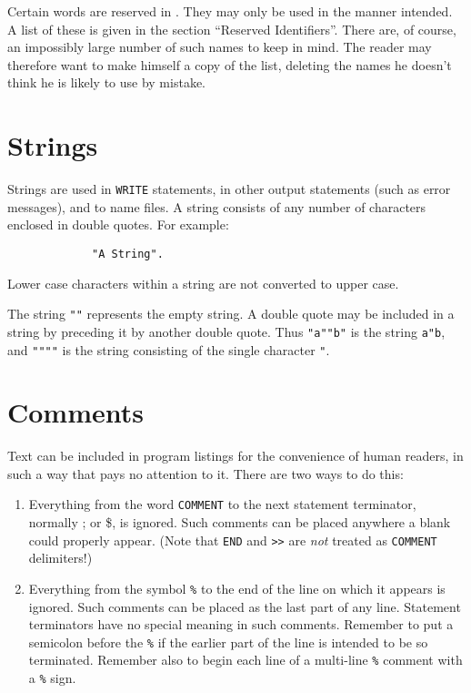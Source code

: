 Certain words are reserved in {\REDUCE}. They may only be used in the manner
intended. A list of these is given in the section ``Reserved Identifiers''.
There are, of course, an impossibly large number of such names to keep in
mind. The reader may therefore want to make himself a copy of the list,
deleting the names he doesn't think he is likely to use by mistake.

\section{Strings}

Strings are used in \texttt{WRITE} statements, in other
output statements (such as error messages), and to name files.  A string
consists of any number of characters enclosed in double quotes.  For example:
\begin{verbatim}
             "A String".
\end{verbatim}
Lower case characters within a string are not converted to upper case.

The string \texttt{""} represents the empty string.  A double quote may be
included in a string by preceding it by another double quote.  Thus
\texttt{"a""b"} is the string \texttt{a"b}, and \texttt{""""} is the string
consisting of the single character \texttt{"}.

\hypertarget{comments}{\section{Comments}}

Text can be included in program listings for the
convenience of human readers, in such a way that {\REDUCE} pays no
attention to it.  There are two ways to do this:

\begin{enumerate}
\item Everything from the word \texttt{COMMENT} to the next
statement terminator, normally ; or \$, is ignored.  Such comments
can be placed anywhere a blank could properly appear. (Note that \texttt{END}
and \texttt{>>} are \emph{not} treated as \texttt{COMMENT} delimiters!)

\item Everything from the symbol \texttt{\%} to the end
of the line on which it appears is ignored.  Such comments can be placed
as the last part of any line.  Statement terminators have no special
meaning in such comments.  Remember to put a semicolon before the \texttt{\%}
if the earlier part of the line is intended to be so terminated.  Remember
also to begin each line of a multi-line \texttt{\%} comment with a \texttt{\%}
sign.
\end{enumerate}

